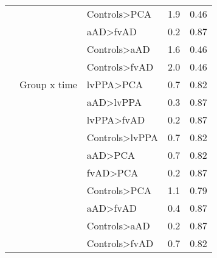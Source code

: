 \documentclass[]{article}
\begin{document}
\begin{table}[ht]
{\begin{tabular}{lllrr}
   &  & Controls>PCA & 1.9 & 0.46 \\ 
   &  & aAD>fvAD & 0.2 & 0.87 \\ 
   &  & Controls>aAD & 1.6 & 0.46 \\ 
   &  & Controls>fvAD & 2.0 & 0.46 \\ 
   & Group x time & lvPPA>PCA & 0.7 & 0.82 \\ 
   &  & aAD>lvPPA & 0.3 & 0.87 \\ 
   &  & lvPPA>fvAD & 0.2 & 0.87 \\ 
   &  & Controls>lvPPA & 0.7 & 0.82 \\ 
   &  & aAD>PCA & 0.7 & 0.82 \\ 
   &  & fvAD>PCA & 0.2 & 0.87 \\ 
   &  & Controls>PCA & 1.1 & 0.79 \\ 
   &  & aAD>fvAD & 0.4 & 0.87 \\ 
   &  & Controls>aAD & 0.2 & 0.87 \\ 
   &  & Controls>fvAD & 0.7 & 0.82 \\ 
   \hline
\end{tabular}
}
\end{table}
\end{document}
